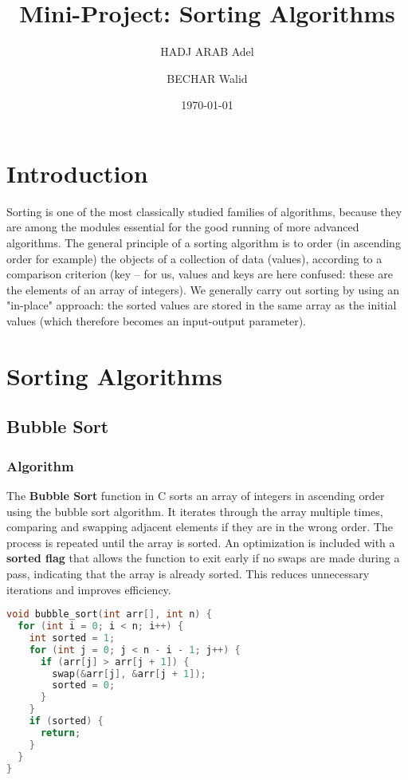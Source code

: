 \documentclass{article}
\title{Mini-Project: Sorting Algorithms}
\author{HADJ ARAB Adel \and BECHAR Walid}
\date{\today}
\begin{document}
\maketitle

\section{Introduction}
Sorting is one of the most classically studied families of algorithms, because they are among the modules essential for the good running of more advanced algorithms. The general principle of a sorting algorithm is to order (in ascending order for example) the objects of a collection of data (values), according to a comparison criterion (key – for us, values and keys are here confused: these are the elements of an array of integers). We generally carry out sorting by using an "in-place" approach: the sorted values are stored in the same array as the initial values (which therefore becomes an input-output parameter).

\section{Sorting Algorithms}

\subsection{Bubble Sort}

\subsubsection{Algorithm}
The \textbf{Bubble Sort} function in C sorts an array of integers in ascending order using the bubble sort algorithm. It iterates through the array multiple times, comparing and swapping adjacent elements if they are in the wrong order. The process is repeated until the array is sorted. An optimization is included with a \textbf{sorted flag} that allows the function to exit early if no swaps are made during a pass, indicating that the array is already sorted. This reduces unnecessary iterations and improves efficiency.

\newpage
\begin{lstlisting}[language=C, caption=Bubble Sort implementation]
void bubble_sort(int arr[], int n) {
  for (int i = 0; i < n; i++) {
    int sorted = 1;
    for (int j = 0; j < n - i - 1; j++) {
      if (arr[j] > arr[j + 1]) {
        swap(&arr[j], &arr[j + 1]);
        sorted = 0;
      }
    }
    if (sorted) {
      return;
    }
  }
}
\end{lstlisting}
\end{document}
